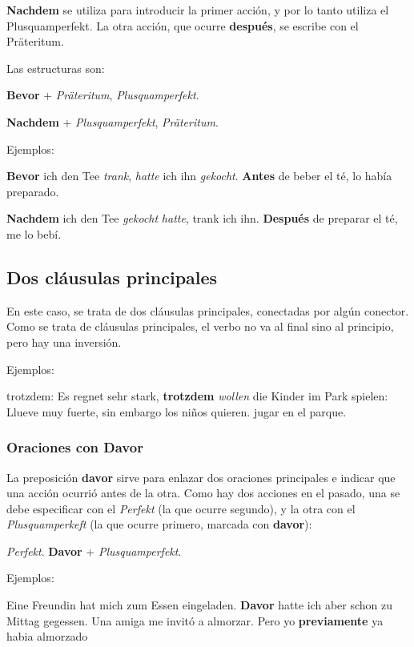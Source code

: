 \textbf{Nachdem} se utiliza para introducir la primer acción, y por lo tanto utiliza el Plusquamperfekt. La otra acción, que ocurre \textbf{después}, se escribe con el Präteritum.

Las estructuras son:

\textbf{Bevor} + \textit{Präteritum}, \textit{Plusquamperfekt}.

\textbf{Nachdem} + \textit{Plusquamperfekt}, \textit{Präteritum}.

Ejemplos:

\textbf{Bevor} ich den Tee \textit{trank}, \textit{hatte} ich ihn \textit{gekocht}. \textbf{Antes} de beber el té, lo había preparado.

\textbf{Nachdem} ich den Tee \textit{gekocht} \textit{hatte}, trank ich ihn. \textbf{Después} de preparar el té, me lo bebí.


\subsection{Dos cláusulas principales}
En este caso, se trata de dos cláusulas principales, conectadas por algún conector. Como se trata de cláusulas principales, el verbo no va al final sino al principio, pero hay una inversión.

Ejemplos:
\begin{myitemize}
\item trotzdem: Es regnet sehr stark, \textbf{trotzdem} \textit{wollen} die Kinder im Park spielen: Llueve muy fuerte, sin embargo los niños quieren. jugar en el parque.
\end{myitemize}


\subsubsection{Oraciones con Davor}
La preposición \textbf{davor} sirve para enlazar dos oraciones principales e indicar que una acción ocurrió antes de la otra. Como hay dos acciones en el pasado, una se debe especificar con el \textit{Perfekt} (la que ocurre segundo), y la otra con el \textit{Plusquamperkeft} (la que ocurre primero, marcada con \textbf{davor}):

\textit{Perfekt}. \textbf{Davor} + \textit{Plusquamperfekt}.

Ejemplos:

Eine Freundin hat mich zum Essen eingeladen. \textbf{Davor} hatte ich aber schon zu Mittag gegessen. Una amiga me invitó a almorzar. Pero yo \textbf{previamente} ya habia almorzado

